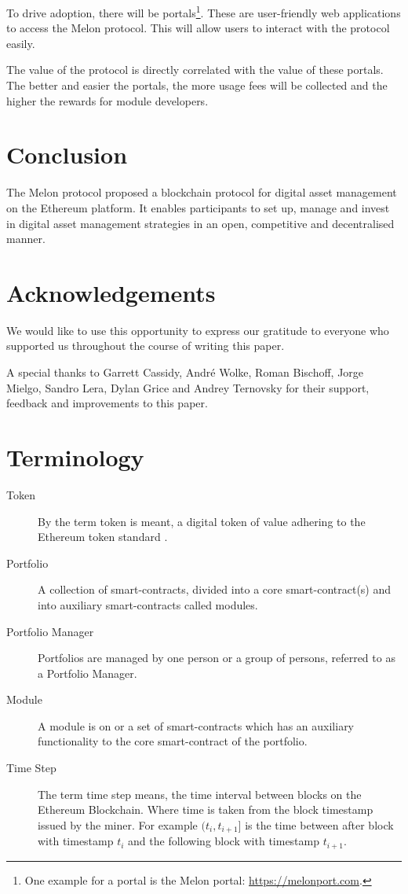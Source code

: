 \documentclass[9pt,oneside]{amsart}
\theoremstyle{plain}
\begin{document}
\begin{multicols}{2}
To drive adoption, there will be portals\footnote{One example for a portal is the Melon portal: \url{https://melonport.com}.}. These are user-friendly web applications to access the Melon protocol. This will allow users to interact with the protocol easily.

The value of the protocol is directly correlated with the value of these portals. The better and easier the portals, the more usage fees will be collected and the higher the rewards for module developers.

\section{Conclusion}\label{sec:conc}

The Melon protocol proposed a blockchain protocol for digital asset management on the Ethereum platform. It enables participants to set up, manage and invest in digital asset management strategies in an open, competitive and decentralised manner.

\section{Acknowledgements}

We would like to use this opportunity to express our gratitude to everyone who supported us throughout the course of writing this paper.

A special thanks to Garrett Cassidy, André Wolke, Roman Bischoff, Jorge Mielgo, Sandro Lera, Dylan Grice and Andrey Ternovsky for their support, feedback and improvements to this paper.



\end{multicols}

\appendix

\section{Terminology}\label{app:term}

\begin{description}
\item[Token] By the term token is meant, a digital token of value adhering to the Ethereum token standard \cite{tokenstandard}.
\item[Portfolio] A collection of smart-contracts, divided into a core smart-contract(s) and into auxiliary smart-contracts called modules.
\item[Portfolio Manager] Portfolios are managed by one person or a group of persons, referred to as a Portfolio Manager.
\item[Module] A module is on or a set of smart-contracts which has an auxiliary functionality to the core smart-contract of the portfolio.
\item[Time Step] The term time step means, the time interval between blocks on the Ethereum Blockchain. Where time is taken from the block timestamp issued by the miner. For example $(t_i, t_{i+1}]$ is the time between after block with timestamp $t_i$ and the following block with timestamp $t_{i+1}$.
	
\end{description}
\end{document}

